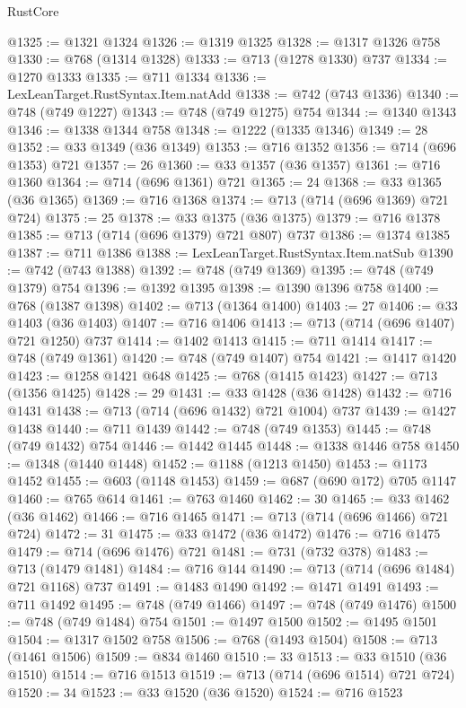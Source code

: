 \begin{lexlean}{RustCore}
\begin{coremodule}
@1325 := @1321 @1324
@1326 := @1319 @1325
@1328 := @1317 @1326 @758
@1330 := @768 (@1314 @1328)
@1333 := @713 (@1278 @1330) @737
@1334 := @1270 @1333
@1335 := @711 @1334
@1336 := LexLeanTarget.RustSyntax.Item.natAdd
@1338 := @742 (@743 @1336)
@1340 := @748 (@749 @1227)
@1343 := @748 (@749 @1275) @754
@1344 := @1340 @1343
@1346 := @1338 @1344 @758
@1348 := @1222 (@1335 @1346)
@1349 := 28
@1352 := @33 @1349 (@36 @1349)
@1353 := @716 @1352
@1356 := @714 (@696 @1353) @721
@1357 := 26
@1360 := @33 @1357 (@36 @1357)
@1361 := @716 @1360
@1364 := @714 (@696 @1361) @721
@1365 := 24
@1368 := @33 @1365 (@36 @1365)
@1369 := @716 @1368
@1374 := @713 (@714 (@696 @1369) @721 @724)
@1375 := 25
@1378 := @33 @1375 (@36 @1375)
@1379 := @716 @1378
@1385 := @713 (@714 (@696 @1379) @721 @807) @737
@1386 := @1374 @1385
@1387 := @711 @1386
@1388 := LexLeanTarget.RustSyntax.Item.natSub
@1390 := @742 (@743 @1388)
@1392 := @748 (@749 @1369)
@1395 := @748 (@749 @1379) @754
@1396 := @1392 @1395
@1398 := @1390 @1396 @758
@1400 := @768 (@1387 @1398)
@1402 := @713 (@1364 @1400)
@1403 := 27
@1406 := @33 @1403 (@36 @1403)
@1407 := @716 @1406
@1413 := @713 (@714 (@696 @1407) @721 @1250) @737
@1414 := @1402 @1413
@1415 := @711 @1414
@1417 := @748 (@749 @1361)
@1420 := @748 (@749 @1407) @754
@1421 := @1417 @1420
@1423 := @1258 @1421 @648
@1425 := @768 (@1415 @1423)
@1427 := @713 (@1356 @1425)
@1428 := 29
@1431 := @33 @1428 (@36 @1428)
@1432 := @716 @1431
@1438 := @713 (@714 (@696 @1432) @721 @1004) @737
@1439 := @1427 @1438
@1440 := @711 @1439
@1442 := @748 (@749 @1353)
@1445 := @748 (@749 @1432) @754
@1446 := @1442 @1445
@1448 := @1338 @1446 @758
@1450 := @1348 (@1440 @1448)
@1452 := @1188 (@1213 @1450)
@1453 := @1173 @1452
@1455 := @603 (@1148 @1453)
@1459 := @687 (@690 @172) @705 @1147
@1460 := @765 @614
@1461 := @763 @1460
@1462 := 30
@1465 := @33 @1462 (@36 @1462)
@1466 := @716 @1465
@1471 := @713 (@714 (@696 @1466) @721 @724)
@1472 := 31
@1475 := @33 @1472 (@36 @1472)
@1476 := @716 @1475
@1479 := @714 (@696 @1476) @721
@1481 := @731 (@732 @378)
@1483 := @713 (@1479 @1481)
@1484 := @716 @144
@1490 := @713 (@714 (@696 @1484) @721 @1168) @737
@1491 := @1483 @1490
@1492 := @1471 @1491
@1493 := @711 @1492
@1495 := @748 (@749 @1466)
@1497 := @748 (@749 @1476)
@1500 := @748 (@749 @1484) @754
@1501 := @1497 @1500
@1502 := @1495 @1501
@1504 := @1317 @1502 @758
@1506 := @768 (@1493 @1504)
@1508 := @713 (@1461 @1506)
@1509 := @834 @1460
@1510 := 33
@1513 := @33 @1510 (@36 @1510)
@1514 := @716 @1513
@1519 := @713 (@714 (@696 @1514) @721 @724)
@1520 := 34
@1523 := @33 @1520 (@36 @1520)
@1524 := @716 @1523

\end{coremodule}
\end{lexlean}
